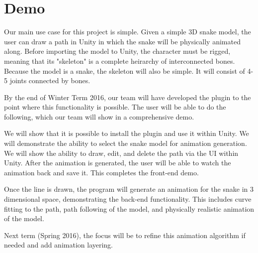 \section{Demo}
Our main use case for this project is simple. Given a simple 3D snake model, the user can draw a path in Unity in which the snake will be physically animated along. Before importing the model to Unity, the character must be rigged, meaning that its "skeleton" is a complete heirarchy of interconnected bones. Because the model is a snake, the skeleton will also be simple. It will consist of 4-5 joints connected by bones.

By the end of Winter Term 2016, our team will have developed the plugin to the point where this functionality is possible. The user will be able to do the following, which our team will show in a comprehensive demo. 

We will show that it is possible to install the plugin and use it within Unity. We will demonstrate the ability to select the snake model for animation generation. We will show the ability to draw, edit, and delete the path via the UI within Unity. After the animation is generated, the user will be able to watch the animation back and save it. This completes the front-end demo.

Once the line is drawn, the program will generate an animation for the snake in 3 dimensional space, demonstrating the back-end functionality. This includes curve fitting to the path, path following of the model, and physically realistic animation of the model.

Next term (Spring 2016), the focus will be to refine this animation algorithm if needed and add animation layering.

